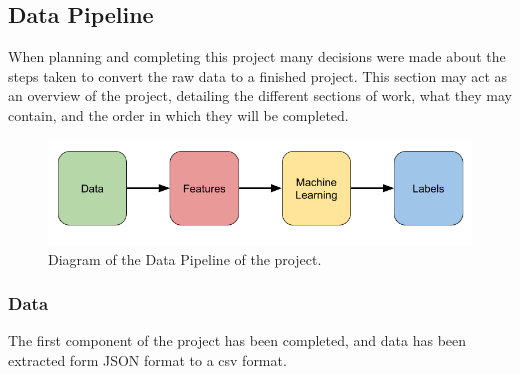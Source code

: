 \documentclass{article}
\begin{document}




\subsection{Data Pipeline}

When planning and completing this project many decisions were made about the steps taken to convert the raw data to a finished project.
This section may act as an overview of the project, detailing the different sections of work, what they may contain, and the order in which they will be completed.

\begin{figure}[ht]
    \centering
    \includegraphics[scale=0.5]{Images/Data-Pipeline.png}
    \caption{Diagram of the Data Pipeline of the project.}
    \label{fig:test}
\end{figure}


\subsubsection{Data}



The first component of the project has been completed, and data has been extracted form JSON format to a csv format.
\end{document}
